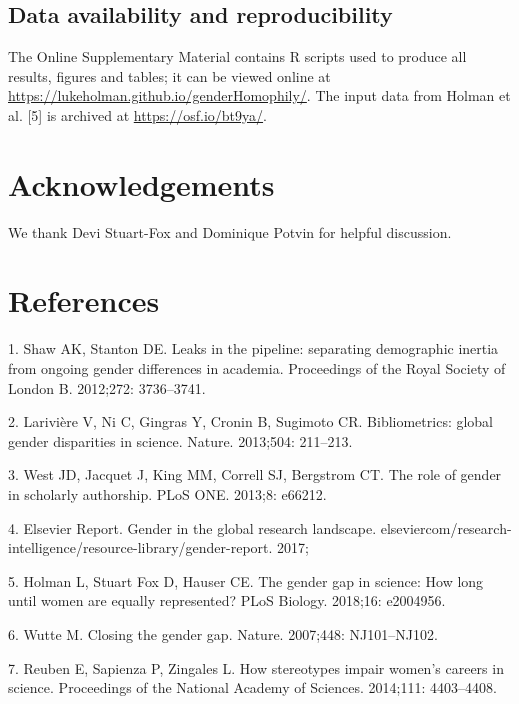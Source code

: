 \documentclass[12pt,]{article}
\begin{document}
\subsection{Data availability and
reproducibility}\label{data-availability-and-reproducibility}

The Online Supplementary Material contains R scripts used to produce all
results, figures and tables; it can be viewed online at
\url{https://lukeholman.github.io/genderHomophily/}. The input data from
Holman et al. {[}5{]} is archived at \url{https://osf.io/bt9ya/}.

\section{Acknowledgements}\label{acknowledgements}

We thank Devi Stuart-Fox and Dominique Potvin for helpful discussion.

\section{References}\label{references}

\hypertarget{refs}{}
\hypertarget{ref-Shaw_2012}{}
1. Shaw AK, Stanton DE. Leaks in the pipeline: separating demographic
inertia from ongoing gender differences in academia. Proceedings of the
Royal Society of London B. 2012;272: 3736--3741.

\hypertarget{ref-Lariviere_2013}{}
2. Larivière V, Ni C, Gingras Y, Cronin B, Sugimoto CR. Bibliometrics:
global gender disparities in science. Nature. 2013;504: 211--213.

\hypertarget{ref-West_2013}{}
3. West JD, Jacquet J, King MM, Correll SJ, Bergstrom CT. The role of
gender in scholarly authorship. PLoS ONE. 2013;8: e66212.

\hypertarget{ref-Elsevier_report}{}
4. Elsevier Report. Gender in the global research landscape.
elseviercom/research-intelligence/resource-library/gender-report. 2017;

\hypertarget{ref-Holman_2018}{}
5. Holman L, Stuart Fox D, Hauser CE. The gender gap in science: How
long until women are equally represented? PLoS Biology. 2018;16:
e2004956.

\hypertarget{ref-Wutte_2007}{}
6. Wutte M. Closing the gender gap. Nature. 2007;448: NJ101--NJ102.

\hypertarget{ref-Reuben_2014}{}
7. Reuben E, Sapienza P, Zingales L. How stereotypes impair women's
careers in science. Proceedings of the National Academy of Sciences.
2014;111: 4403--4408.
\end{document}
